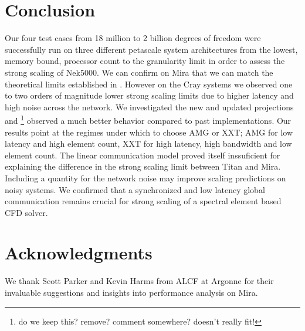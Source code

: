 \documentclass{sig-alternate}
\begin{document}
\section{Conclusion}
Our four test cases from 18 million to 2 billion degrees of freedom were
successfully run on three different petascale system architectures from the
lowest, memory bound, processor count to the granularity limit in order to
assess the strong scaling of Nek5000. We can confirm on Mira that  we can match the theoretical limits established in \cite{fischer:scaling}. However on the Cray systems we observed one to two orders of magnitude
lower strong scaling limits due to higher
latency and high noise across the network. We investigated the new
and updated projections and \footnote{do we keep this? remove? comment somewhere? doesn't really fit!} observed a much better behavior compared to past
implementations. Our results point at the regimes under which to choose AMG or
XXT; AMG for low latency and high element count, XXT for high latency, high
bandwidth and low element count. The linear communication model proved itself inssuficient for explaining the difference in
the strong scaling limit between Titan and Mira. Including a 
quantity for the network noise may improve scaling predictions on noisy systems.
We confirmed that a synchronized and low latency global communication remains crucial for strong scaling of a spectral element based CFD solver.

\section{Acknowledgments}
We thank Scott Parker and Kevin Harms from ALCF at Argonne for their invaluable
suggestions and insights into performance analysis on Mira. 
%

%
%
\end{document}
